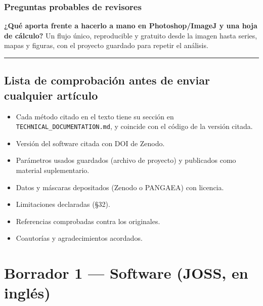 \documentclass[
  10pt,
]{article}
\providecommand{\tightlist}{%
  \setlength{\itemsep}{0pt}\setlength{\parskip}{0pt}}
\begin{document}
\hypertarget{preguntas-probables-de-revisores-3}{%
\subsubsection{Preguntas probables de
revisores}\label{preguntas-probables-de-revisores-3}}

\textbf{¿Qué aporta frente a hacerlo a mano en Photoshop/ImageJ y una
hoja de cálculo?} Un flujo único, reproducible y gratuito desde la
imagen hasta series, mapas y figuras, con el proyecto guardado para
repetir el análisis.

\begin{center}\rule{0.5\linewidth}{0.5pt}\end{center}

\hypertarget{lista-de-comprobaciuxf3n-antes-de-enviar-cualquier-artuxedculo}{%
\subsection{Lista de comprobación antes de enviar cualquier
artículo}\label{lista-de-comprobaciuxf3n-antes-de-enviar-cualquier-artuxedculo}}

\begin{itemize}
\tightlist
\item[$\square$]
  Cada método citado en el texto tiene su sección en
  \texttt{TECHNICAL\_DOCUMENTATION.md}, y coincide con el código de la
  versión citada.
\item[$\square$]
  Versión del software citada con DOI de Zenodo.
\item[$\square$]
  Parámetros usados guardados (archivo de proyecto) y publicados como
  material suplementario.
\item[$\square$]
  Datos y máscaras depositados (Zenodo o PANGAEA) con licencia.
\item[$\square$]
  Limitaciones declaradas (§32).
\item[$\square$]
  Referencias comprobadas contra los originales.
\item[$\square$]
  Coautorías y agradecimientos acordados.
\end{itemize}

\newpage

\hypertarget{borrador-1-software-joss-en-ingluxe9s}{%
\section{Borrador 1 --- Software (JOSS, en
inglés)}\label{borrador-1-software-joss-en-ingluxe9s}}
\end{document}
